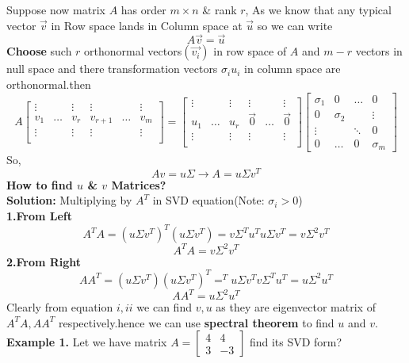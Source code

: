 \documentclass[a4paper,11pt]{article}
\numberwithin{equation}{section}
\begin{document}
\begin{itemize}
Suppose now matrix $A$ has order $m\times n$ \& rank $r$, As we know that any typical vector $\vec{v}$ in Row space lands in Column space at $\vec{u}$ so we can write
\[A\vec{v}=\vec{u}\]
\textbf{Choose} such $r$ orthonormal vectors$(\vec{v_i})$ in row space of $A$ and $m-r$ vectors in null space and there transformation vectors $\sigma_iu_i$ in column space are orthonormal.then
\[A\begin{bmatrix}
    \vdots&&\vdots&\vdots&&\vdots\\
    v_1&\dots&v_r&v_{r+1}&\dots&v_m\\
    \vdots&&\vdots&\vdots&&\vdots\\
\end{bmatrix}=\begin{bmatrix}
    \vdots&&\vdots&\vdots&&\vdots\\
    u_1&\dots&u_r&\vec{0}&\dots&\vec{0}\\
    \vdots&&\vdots&\vdots&&\vdots\\
\end{bmatrix}\begin{bmatrix}
    \sigma_1&0&\dots&0\\
    0&\sigma_2&&\vdots\\
    \vdots&&\ddots&0\\
    0&\dots&0&\sigma_m
\end{bmatrix}
\]
So,
\begin{equation}
    Av=u\Sigma \longrightarrow A=u\Sigma v^T \tag{SVD}
\end{equation}
\textbf{How to find $u$ \& $v$ Matrices?}\\

\textbf{Solution: }Multiplying by $A^T$ in SVD equation(Note:  $\sigma_i>0$)\\

\textbf{1.From Left}\[A^TA=(u\Sigma v^T)^T(u\Sigma v^T)=v\Sigma^Tu^Tu\Sigma v^T=v\Sigma^2v^T\]
\begin{equation}
    A^TA=v\Sigma^2v^T \tag{$i$}
\end{equation}
\textbf{2.From Right}\[AA^T=(u\Sigma v^T)(u\Sigma v^T)^T=^Tu\Sigma v^Tv\Sigma^Tu^T=u\Sigma^2u^T\]
\begin{equation}
    AA^T=u\Sigma^2u^T \tag{$ii$}
\end{equation}
Clearly from equation $i,ii$ we can find $v,u$ as they are eigenvector matrix of $A^TA,AA^T$ respectively.hence we can use \textbf{spectral theorem} to find $u$ and $v$.\\

\textbf{Example 1.} Let we have  matrix $A=\begin{bmatrix}
    4&4\\3&-3
\end{bmatrix}$ find its SVD form?\\


\end{itemize}
\end{document}
